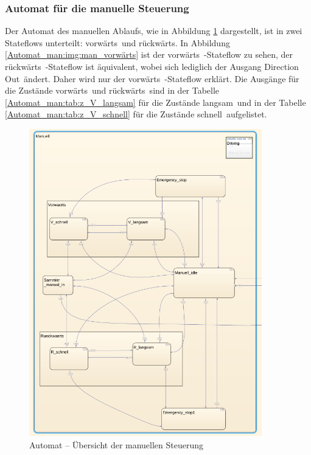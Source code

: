 \subsubsection{Automat für die manuelle Steuerung}
\label{Automatensteuerung:Automat_man}

Der Automat des manuellen Ablaufs, wie in Abbildung \ref{Automat_man:img:man_übersicht} dargestellt, ist in zwei Stateflows unterteilt: \frqq vorwärts\flqq\ und \frqq rückwärts\flqq . In Abbildung \ref{Automat_man:img:man_vorwärts} ist der \frqq vorwärts\flqq\ -Stateflow zu sehen, der \frqq rückwärts\flqq\ -Stateflow ist äquivalent, wobei sich lediglich der Ausgang \frqq Direction Out\flqq\ ändert. Daher wird nur der \frqq vorwärts\flqq\ -Stateflow erklärt. Die Ausgänge für die Zustände \frqq vorwärts\flqq\ und \frqq rückwärts\flqq\ sind in der Tabelle \ref{Automat_man:tab:z_V_langsam} für die Zustände \frqq langsam\flqq\ und in der Tabelle \ref{Automat_man:tab:z_V_schnell} für die Zustände \frqq schnell\flqq\ aufgelistet.




\pagebreak[1]
\begin{figure}[!ht]
	\begin{center}
		\includegraphics[width=0.9\textwidth]{img/5_simulation/Automat_man_uebersicht.png}
		\caption{Automat – Übersicht der manuellen Steuerung}
		\label{Automat_man:img:man_übersicht}
	\end{center}
\end{figure}
\pagebreak[1]


